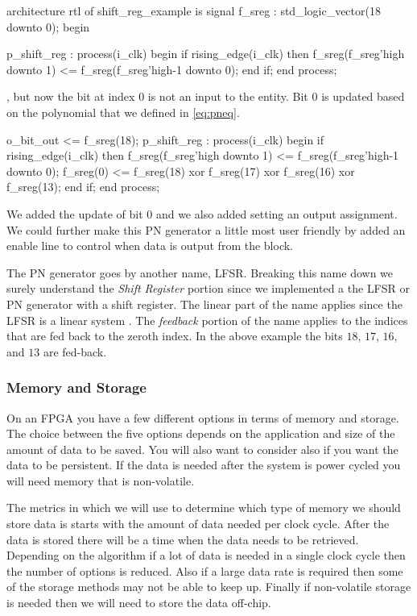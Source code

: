 \begin{VHDLlisting}[tabsize=4]
architecture rtl of shift_reg_example is
    signal f_sreg : std_logic_vector(18 downto 0);
begin

p_shift_reg : process(i_clk)
begin
    if rising_edge(i_clk) then
        f_sreg(f_sreg'high downto 1) <= f_sreg(f_sreg'high-1 downto 0);
    end if;
end process;
\end{VHDLlisting}
\noindent
, but now the bit at index $0$ is not an input to the entity. Bit $0$ is updated based on the polynomial that we defined in \ref{eq:pneq}. 	

\begin{VHDLlisting}[tabsize=4]
o_bit_out <= f_sreg(18);
p_shift_reg : process(i_clk)
begin
    if rising_edge(i_clk) then
        f_sreg(f_sreg'high downto 1) <= f_sreg(f_sreg'high-1 downto 0);
        f_sreg(0) <= f_sreg(18) xor 
                     f_sreg(17) xor 
                     f_sreg(16) xor 
                     f_sreg(13);
    end if;
end process;
\end{VHDLlisting}

We added the update of bit $0$ and we also added setting an output assignment. We could further make this \ac{PN} generator a little most user friendly by added an enable line to control when data is output from the block.

The \ac{PN} generator goes by another name, \ac{LFSR}. Breaking this name down we surely understand the \emph{Shift Register} portion since we implemented a the \ac{LFSR} or \ac{PN} generator with a shift register. The linear part of the name applies since the \ac{LFSR} is a linear system \cite{krawczyk1994lfsr}. The \emph{feedback} portion of the name applies to the indices that are fed back to the zeroth index. In the above example the bits $18$, $17$, $16$, and $13$ are fed-back.

	
\subsubsection{Memory and Storage}

On an \ac{FPGA} you have a few different options in terms of memory and storage. The choice between the five options depends on the application and size of the amount of data to be saved. You will also want to consider also if you want the data to be persistent. If the data is needed after the system is power cycled you will need memory that is non-volatile. 

The metrics in which we will use to determine which type of memory we should store data is starts with the amount of data needed per clock cycle. After the data is stored there will be a time when the data needs to be retrieved. Depending on the algorithm if a lot of data is needed in a single clock cycle then the number of options is reduced. Also if a large data rate is required then some of the storage methods may not be able to keep up. Finally if non-volatile storage is needed then we will need to store the data off-chip. 

